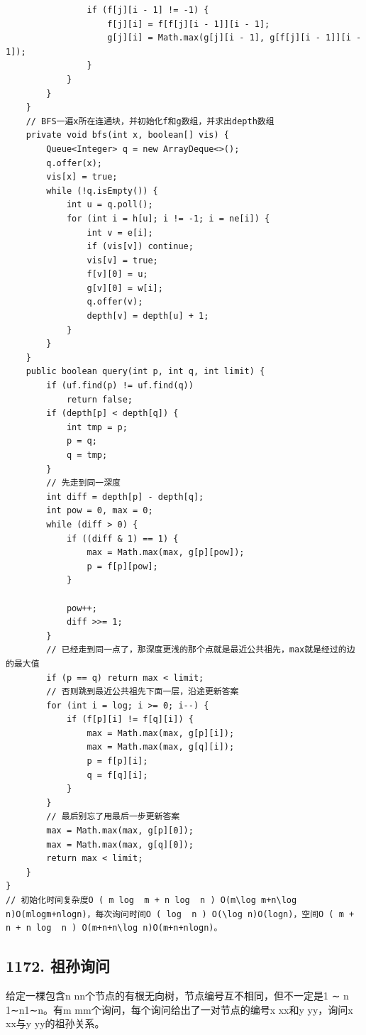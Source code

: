 \documentclass[9pt, b5paaper]{book}
\begin{document}
\begin{verbatim}
                if (f[j][i - 1] != -1) {
                    f[j][i] = f[f[j][i - 1]][i - 1];
                    g[j][i] = Math.max(g[j][i - 1], g[f[j][i - 1]][i - 1]);
                }
            }
        }
    }
    // BFS一遍x所在连通块，并初始化f和g数组，并求出depth数组
    private void bfs(int x, boolean[] vis) {
        Queue<Integer> q = new ArrayDeque<>();
        q.offer(x);
        vis[x] = true;
        while (!q.isEmpty()) {
            int u = q.poll();
            for (int i = h[u]; i != -1; i = ne[i]) {
                int v = e[i];
                if (vis[v]) continue;
                vis[v] = true;
                f[v][0] = u;
                g[v][0] = w[i];
                q.offer(v);
                depth[v] = depth[u] + 1;
            }
        }
    }
    public boolean query(int p, int q, int limit) {
        if (uf.find(p) != uf.find(q)) 
            return false;
        if (depth[p] < depth[q]) {
            int tmp = p;
            p = q;
            q = tmp;
        }
        // 先走到同一深度
        int diff = depth[p] - depth[q];
        int pow = 0, max = 0;
        while (diff > 0) {
            if ((diff & 1) == 1) {
                max = Math.max(max, g[p][pow]);
                p = f[p][pow];
            }

            pow++;
            diff >>= 1;
        }
        // 已经走到同一点了，那深度更浅的那个点就是最近公共祖先，max就是经过的边的最大值
        if (p == q) return max < limit;
        // 否则跳到最近公共祖先下面一层，沿途更新答案
        for (int i = log; i >= 0; i--) {
            if (f[p][i] != f[q][i]) {
                max = Math.max(max, g[p][i]);
                max = Math.max(max, g[q][i]);
                p = f[p][i];
                q = f[q][i];
            }
        }
        // 最后别忘了用最后一步更新答案
        max = Math.max(max, g[p][0]);
        max = Math.max(max, g[q][0]);
        return max < limit;
    }
}
// 初始化时间复杂度O ( m log ⁡ m + n log ⁡ n ) O(m\log m+n\log n)O(mlogm+nlogn)，每次询问时间O ( log ⁡ n ) O(\log n)O(logn)，空间O ( m + n + n log ⁡ n ) O(m+n+n\log n)O(m+n+nlogn)。
\end{verbatim}

\subsection{1172. 祖孙询问}
\label{sec-10-0-8}
给定一棵包含n nn个节点的有根无向树，节点编号互不相同，但不一定是1 ∼ n 1∼n1∼n。有m mm个询问，每个询问给出了一对节点的编号x xx和y yy，询问x xx与y yy的祖孙关系。
\end{document}
